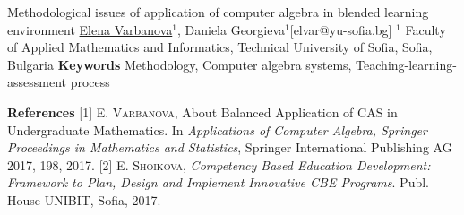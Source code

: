 \begin{abstract_online}{Methodological issues of application of computer algebra in blended learning environment}{%
        \underline{Elena Varbanova}$^{1}$, Daniela Georgieva$^{1}$}{[elvar@yu-sofia.bg]
        }{%
        $^1$ Faculty of Applied Mathematics and Informatics, Technical University of Sofia, Sofia, Bulgaria }
\textbf{Keywords} \newline{} Methodology, Computer algebra systems, Teaching-learning-assessment process

\textbf{References} \newline{}
[1] \textsc{E. Varbanova}, About Balanced Application of CAS in Undergraduate Mathematics. In \emph{Applications of Computer Algebra, Springer Proceedings in Mathematics and Statistics}, Springer International Publishing AG 2017, 198, 2017. \newline{}
[2] \textsc{E. Shoikova}, \emph{Competency Based Education Development: Framework to Plan, Design and Implement Innovative CBE Programs}. Publ. House UNIBIT, Sofia, 2017. \newline{}

\end{abstract_online}

    